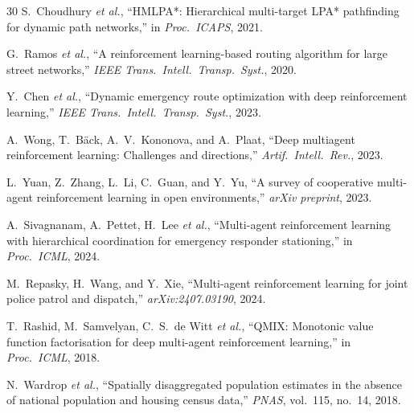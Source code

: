 \documentclass[conference]{IEEEtran}
\begin{document}
\begin{thebibliography}{30}
S.~Choudhury \textit{et al.},
``HMLPA*: Hierarchical multi-target LPA* pathfinding for dynamic path
networks,''
in \textit{Proc.\ ICAPS}, 2021.

G.~Ramos \textit{et al.},
``A reinforcement learning-based routing algorithm for large street
networks,''
\textit{IEEE Trans.\ Intell.\ Transp.\ Syst.}, 2020.

Y.~Chen \textit{et al.},
``Dynamic emergency route optimization with deep reinforcement learning,''
\textit{IEEE Trans.\ Intell.\ Transp.\ Syst.}, 2023.

A.~Wong, T.~Bäck, A.~V.~Kononova, and A.~Plaat,
``Deep multiagent reinforcement learning: Challenges and directions,''
\textit{Artif.\ Intell.\ Rev.}, 2023.

L.~Yuan, Z.~Zhang, L.~Li, C.~Guan, and Y.~Yu,
``A survey of cooperative multi-agent reinforcement learning in open
environments,''
\textit{arXiv preprint}, 2023.

A.~Sivagnanam, A.~Pettet, H.~Lee \textit{et al.},
``Multi-agent reinforcement learning with hierarchical coordination for
emergency responder stationing,''
in \textit{Proc.\ ICML}, 2024.

M.~Repasky, H.~Wang, and Y.~Xie,
``Multi-agent reinforcement learning for joint police patrol and dispatch,''
\textit{arXiv:2407.03190}, 2024.

T.~Rashid, M.~Samvelyan, C.~S.~de Witt \textit{et al.},
``QMIX: Monotonic value function factorisation for deep multi-agent
reinforcement learning,''
in \textit{Proc.\ ICML}, 2018.

N.~Wardrop \textit{et al.},
``Spatially disaggregated population estimates in the absence of national
population and housing census data,''
\textit{PNAS}, vol.~115, no.~14, 2018.

\end{thebibliography}
\end{document}

